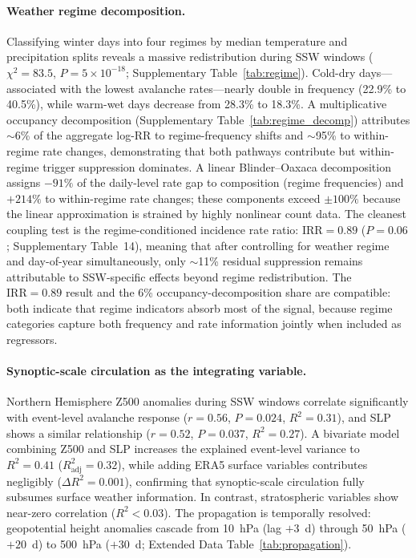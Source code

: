 \documentclass[11pt,letterpaper]{article}
\begin{document}
\paragraph{Weather regime decomposition.} Classifying winter days into four regimes by median temperature and precipitation splits reveals a massive redistribution during SSW windows ($\chi^2 = 83.5$, $P = 5 \times 10^{-18}$; Supplementary Table~\ref{tab:regime}). Cold-dry days---associated with the lowest avalanche rates---nearly double in frequency (22.9\% to 40.5\%), while warm-wet days decrease from 28.3\% to 18.3\%. A multiplicative occupancy decomposition (Supplementary Table~\ref{tab:regime_decomp}) attributes $\sim$6\% of the aggregate log-RR to regime-frequency shifts and $\sim$95\% to within-regime rate changes, demonstrating that both pathways contribute but within-regime trigger suppression dominates. A linear Blinder--Oaxaca decomposition assigns $-91\%$ of the daily-level rate gap to composition (regime frequencies) and $+214\%$ to within-regime rate changes; these components exceed $\pm 100\%$ because the linear approximation is strained by highly nonlinear count data. The cleanest coupling test is the regime-conditioned incidence rate ratio: $\mathrm{IRR} = 0.89$ ($P = 0.06$; Supplementary Table~14), meaning that after controlling for weather regime and day-of-year simultaneously, only $\sim$11\% residual suppression remains attributable to SSW-specific effects beyond regime redistribution. The $\mathrm{IRR} = 0.89$ result and the 6\% occupancy-decomposition share are compatible: both indicate that regime indicators absorb most of the signal, because regime categories capture both frequency and rate information jointly when included as regressors.

\paragraph{Synoptic-scale circulation as the integrating variable.} Northern Hemisphere Z500 anomalies during SSW windows correlate significantly with event-level avalanche response ($r = 0.56$, $P = 0.024$, $R^2 = 0.31$), and SLP shows a similar relationship ($r = 0.52$, $P = 0.037$, $R^2 = 0.27$). A bivariate model combining Z500 and SLP increases the explained event-level variance to $R^2 = 0.41$ ($R^2_{\mathrm{adj}} = 0.32$), while adding ERA5 surface variables contributes negligibly ($\Delta R^2 = 0.001$), confirming that synoptic-scale circulation fully subsumes surface weather information. In contrast, stratospheric variables show near-zero correlation ($R^2 < 0.03$). The propagation is temporally resolved: geopotential height anomalies cascade from 10~hPa (lag $+3$~d) through 50~hPa ($+20$~d) to 500~hPa ($+30$~d; Extended Data Table~\ref{tab:propagation}).
\end{document}
